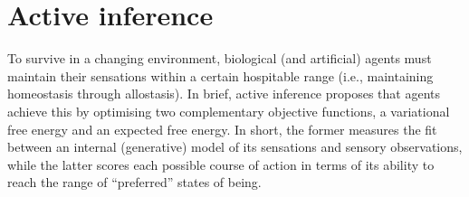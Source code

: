 \documentclass{article}
\begin{document}
\section{Active inference}
\label{sec: active inference}

To survive in a changing environment, biological (and artificial) agents must maintain their sensations within a certain hospitable range (i.e., maintaining homeostasis through allostasis). In brief, active inference proposes that agents achieve this by optimising two complementary objective functions, a variational free energy and an expected free energy. In short, the former measures the fit between an internal (generative) model of its sensations and sensory observations, while the latter scores each possible course of action in terms of its ability to reach the range of “preferred” states of being.
\end{document}
